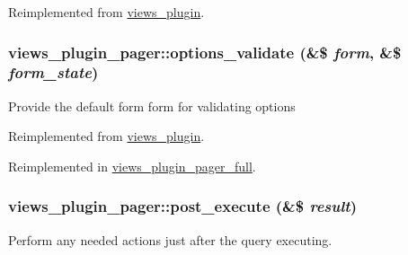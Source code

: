 Reimplemented from \hyperlink{classviews__plugin_a442b0f392deb52725ec8159e05654e06}{views\_\-plugin}.\hypertarget{classviews__plugin__pager_a5988e87c8ebcaed872cad117e9721515}{
\subsubsection[{options\_\-validate}]{\setlength{\rightskip}{0pt plus 5cm}views\_\-plugin\_\-pager::options\_\-validate (\&\$ {\em form}, \/  \&\$ {\em form\_\-state})}}
\label{classviews__plugin__pager_a5988e87c8ebcaed872cad117e9721515}
Provide the default form form for validating options 

Reimplemented from \hyperlink{classviews__plugin_a46d72eb35feea36fed83cd1355a47431}{views\_\-plugin}.

Reimplemented in \hyperlink{classviews__plugin__pager__full_a00fca2bdd3dfda2bea07b01a6f8384a4}{views\_\-plugin\_\-pager\_\-full}.\hypertarget{classviews__plugin__pager_a59687607f417ac6b3787ddb0ce71757c}{
\subsubsection[{post\_\-execute}]{\setlength{\rightskip}{0pt plus 5cm}views\_\-plugin\_\-pager::post\_\-execute (\&\$ {\em result})}}
\label{classviews__plugin__pager_a59687607f417ac6b3787ddb0ce71757c}
Perform any needed actions just after the query executing. 

